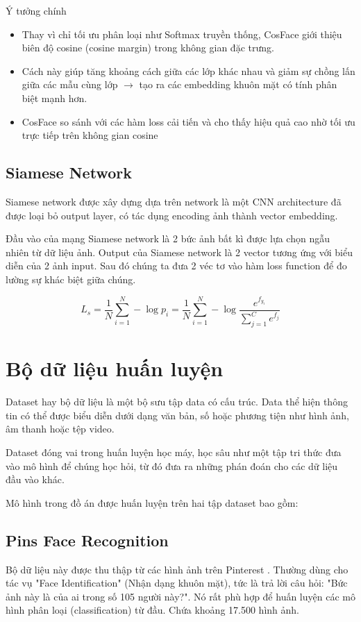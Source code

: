 \documentclass[../DoAn.tex]{subfiles}
\begin{document}
Ý tưởng chính
\begin{itemize}
	\item Thay vì chỉ tối ưu phân loại như Softmax truyền thống, CosFace giới thiệu biên độ cosine (cosine margin) trong không gian đặc trưng.
	\item Cách này giúp tăng khoảng cách giữa các lớp khác nhau và giảm sự chồng lấn giữa các mẫu cùng lớp $\rightarrow$ tạo ra các embedding khuôn mặt có tính phân biệt mạnh hơn.
	\item CosFace so sánh với các hàm loss cải tiến và cho thấy hiệu quả cao nhờ tối ưu trực tiếp trên không gian cosine
\end{itemize}
\subsection{Siamese Network}
Siamese network được xây dựng dựa trên network là một CNN architecture đã được loại bỏ output layer, có tác dụng encoding ảnh thành vector embedding.

Đầu vào của mạng Siamese network là 2 bức ảnh bất kì được lựa chọn ngẫu nhiên từ dữ liệu ảnh. Output của Siamese network là 2 vector tương ứng với biểu diễn của 2 ảnh input. Sau đó chúng ta đưa 2 véc tơ vào hàm loss function để đo lường sự khác biệt giữa chúng.

\[L_s = \frac{1}{N} \sum_{i=1}^{N} -\log p_i = \frac{1}{N} \sum_{i=1}^{N} -\log \frac{e^{f_{y_i}}}{\sum_{j=1}^{C} e^{f_j}}
\]
\section{Bộ dữ liệu huấn luyện}
Dataset hay bộ dữ liệu là  một bộ sưu tập data có cấu trúc. Data thể hiện thông tin có thể được biểu diễn dưới dạng văn bản, số hoặc phương tiện như hình ảnh, âm thanh hoặc tệp video.

Dataset đóng vai trong huấn luyện học máy, học sâu như một tập tri thức đưa vào mô hình để chúng học hỏi, từ đó đưa ra những phán đoán cho các dữ liệu đầu vào khác.

Mô hình trong đồ án được huấn luyện trên hai tập dataset bao gồm:
\subsection{Pins Face Recognition}
Bộ dữ liệu này được thu thập từ các hình ảnh trên Pinterest \cite{pinFace}. Thường dùng cho tác vụ "Face Identification" (Nhận dạng khuôn mặt), tức là trả lời câu hỏi: "Bức ảnh này là của ai trong số 105 người này?". Nó rất phù hợp để huấn luyện các mô hình phân loại (classification) từ đầu. Chứa khoảng 17.500 hình ảnh.
\end{document}
